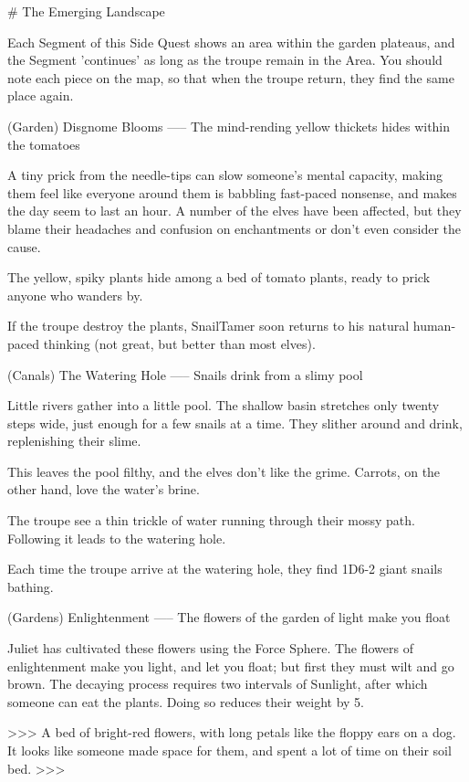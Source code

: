 # The Emerging Landscape

Each Segment of this Side Quest shows an area within the garden plateaus, and the Segment 'continues' as long as the troupe remain in the Area.
You should note each piece on the map, so that when the troupe return, they find the same place again.

(Garden) Disgnome Blooms
-----
{The mind-rending yellow thickets hides within the tomatoes}

A tiny prick from the needle-tips can slow someone's mental capacity, making them feel like everyone around them is babbling fast-paced nonsense, and makes the day seem to last an hour.
A number of the elves have been affected, but they blame their headaches and confusion on enchantments or don't even consider the cause.

The yellow, spiky plants hide among a bed of tomato plants, ready to prick anyone who wanders by.

If the troupe destroy the plants,
\gls{SnailTamer} soon returns to his natural human-paced thinking (not great, but better than most elves).

(Canals) The Watering Hole
-----
{Snails drink from a slimy pool}

Little rivers gather into a little pool.
The shallow basin stretches only twenty steps wide, just enough for a few snails at a time.
They slither around and drink, replenishing their slime.

This leaves the pool filthy, and the elves don't like the grime.
Carrots, on the other hand, love the water's brine.

The troupe see a thin trickle of water running through their mossy path.
Following it leads to the watering hole.

Each time the troupe arrive at the watering hole,
they find 1D6-2 giant snails bathing.

(Gardens) Enlightenment
-----
{The flowers of the garden of light make you float}

Juliet has cultivated these flowers using the Force Sphere.
The flowers of enlightenment make you light, and let you float; but first they must wilt and go brown.
The decaying process requires two \glspl{interval} of Sunlight, after which someone can eat the plants.
Doing so reduces their \gls{weight} by 5.

>>>
A bed of bright-red flowers, with long petals like the floppy ears on a dog.
It looks like someone made space for them, and spent a lot of time on their soil bed.
>>>

